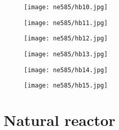 \documentclass[aspectratio=1610,pdftex,dvipsnames,compress,xcolor={dvipsnames}]{beamer}
\begin{document}
\begin{frame}{}
    \begin{figure}
        \centering
        \texttt{[image: ne585/hb10.jpg]}
    \end{figure}
\end{frame}


\begin{frame}{}
    \begin{figure}
        \centering
        \texttt{[image: ne585/hb11.jpg]}
    \end{figure}
\end{frame}


\begin{frame}{}
    \begin{figure}
        \centering
        \texttt{[image: ne585/hb12.jpg]}
    \end{figure}
\end{frame}


\begin{frame}{}
    \begin{figure}
        \centering
        \texttt{[image: ne585/hb13.jpg]}
    \end{figure}
\end{frame}


\begin{frame}{}
    \begin{figure}
        \centering
        \texttt{[image: ne585/hb14.jpg]}
    \end{figure}
\end{frame}


\begin{frame}{}
    \begin{figure}
        \centering
        \texttt{[image: ne585/hb15.jpg]}
    \end{figure}
\end{frame}


\section{Natural reactor}
\end{document}
